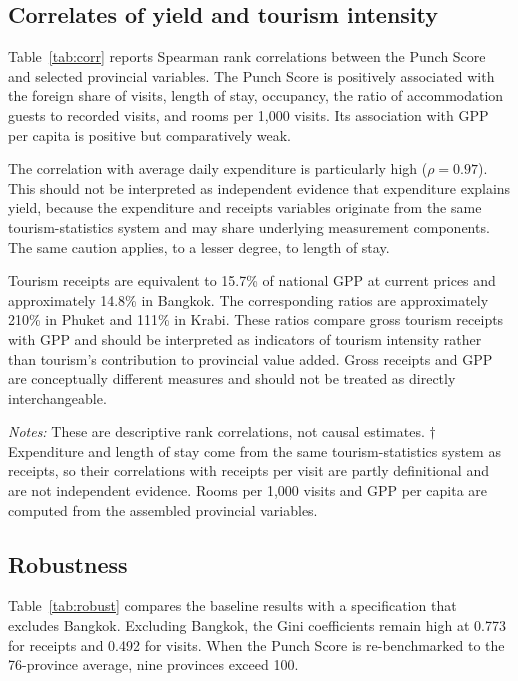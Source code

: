 \documentclass[11pt,a4paper]{article}
\begin{document}
\subsection{Correlates of yield and tourism intensity}
Table~\ref{tab:corr} reports Spearman rank correlations between the Punch Score and selected provincial variables. The Punch Score is positively associated with the foreign share of visits, length of stay, occupancy, the ratio of accommodation guests to recorded visits, and rooms per 1,000 visits. Its association with GPP per capita is positive but comparatively weak.

The correlation with average daily expenditure is particularly high ($\rho=0.97$). This should not be interpreted as independent evidence that expenditure explains yield, because the expenditure and receipts variables originate from the same tourism-statistics system and may share underlying measurement components. The same caution applies, to a lesser degree, to length of stay.

Tourism receipts are equivalent to 15.7\% of national GPP at current prices and approximately 14.8\% in Bangkok. The corresponding ratios are approximately 210\% in Phuket and 111\% in Krabi. These ratios compare gross tourism receipts with GPP and should be interpreted as indicators of tourism intensity rather than tourism's contribution to provincial value added. Gross receipts and GPP are conceptually different measures and should not be treated as directly interchangeable.

\begin{table}[t]\centering\small
\caption{Spearman rank correlations with the Punch Score, 2024}\label{tab:corr}
\resizebox{\textwidth}{!}{}\par\smallskip
\parbox{\textwidth}{\scriptsize\emph{Notes:} These are descriptive rank correlations, not causal estimates. $\dagger$ Expenditure and length of stay come from the same tourism-statistics system as receipts, so their correlations with receipts per visit are partly definitional and are not independent evidence. Rooms per 1,000 visits and GPP per capita are computed from the assembled provincial variables.}
\end{table}

\subsection{Robustness}\label{sec:robust}
Table~\ref{tab:robust} compares the baseline results with a specification that excludes Bangkok. Excluding Bangkok, the Gini coefficients remain high at 0.773 for receipts and 0.492 for visits. When the Punch Score is re-benchmarked to the 76-province average, nine provinces exceed 100.
\end{document}
